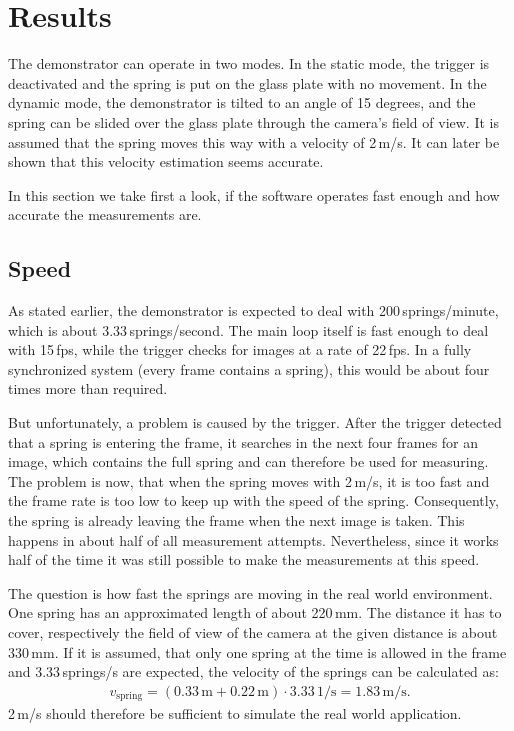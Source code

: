 \chapter{Results}
The demonstrator can operate in two modes.
In the static mode, the trigger is deactivated and the spring is put on the glass plate with no movement.
In the dynamic mode, the demonstrator is tilted to an angle of 15 degrees, and the spring can be slided over the glass plate through the camera's field of view.
It is assumed that the spring moves this way with a velocity of 2\,m/s.
It can later be shown that this velocity estimation seems accurate.

In this section we take first a look, if the software operates fast enough and how accurate the measurements are.

\section{Speed}
As stated earlier, the demonstrator is expected to deal with 200\,springs/minute, which is about 3.33\,springs/second.
The main loop itself is fast enough to deal with 15\,fps, while the trigger checks for images at a rate of 22\,fps.
In a fully synchronized system (every frame contains a spring), this would be about four times more than required.

But unfortunately, a problem is caused by the trigger.
After the trigger detected that a spring is entering the frame, it searches in the next four frames for an image, which contains the full spring and can therefore be used for measuring.
The problem is now, that when the spring moves with 2\,m/s, it is too fast and the frame rate is too low to keep up with the speed of the spring. Consequently, the spring is already leaving the frame when the next image is taken. 
This happens in about half of all measurement attempts.
Nevertheless, since it works half of the time it was still possible to make the measurements at this speed.

The question is how fast the springs are moving in the real world environment.
One spring has an approximated length of about 220\,mm.
The distance it has to cover, respectively the field of view of the camera at the given distance is about 330\,mm.
If it is assumed, that only one spring at the time is allowed in the frame and 3.33\,springs/s are expected, the velocity of the springs can be calculated as:
\begin{align*}
	v_{\text{spring}}=(0.33\,\text{m}+0.22\,\text{m})\cdot 3.33\,1/\text{s}=1.83\,\text{m/s}.
\end{align*}
2\,m/s should therefore be sufficient to simulate the real world application.

